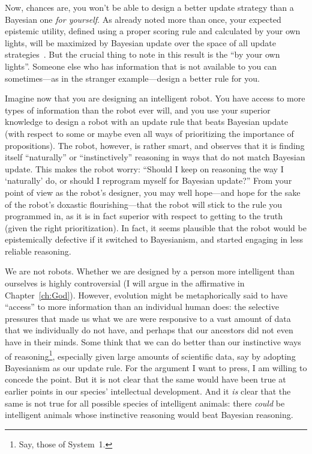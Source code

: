Now, chances are, you won't be able to design a better update strategy than a Bayesian one \textit{for yourself}.
As already noted more than once, your expected epistemic utility, defined using a proper scoring rule and calculated by your 
own lights, will be maximized by Bayesian update over the space of all update strategies~\parencite{GreavesWallace}. But the crucial thing to 
note in this result is the ``by your own lights''. Someone else who has information that is not available to you can 
sometimes---as in the stranger example---design a better rule for you. 

Imagine now that you are designing an intelligent robot. You have access to more types of information than the robot ever 
will, and you use your superior knowledge to design a robot with an update rule that beats Bayesian update (with respect to 
some or maybe even all ways of prioritizing the importance of propositions). The robot, however, is rather smart, 
and observes that it is finding itself ``naturally'' or ``instinctively'' reasoning in ways that do not match Bayesian update. This makes the 
robot worry: ``Should I keep on reasoning the way I `naturally' do, or should I reprogram myself for Bayesian update?''
From your point of view as the robot's designer, you may well hope---and hope for the sake of the robot's doxastic
flourishing---that the robot will stick to the rule you programmed in, as it is in fact superior with respect to getting
to the truth (given the right prioritization). In fact, it seems plausible that the robot would be epistemically defective 
if it switched to Bayesianism, and started engaging in less reliable reasoning.

We are not robots. Whether we are designed by a person more intelligent than ourselves is highly controversial (I will 
argue in the affirmative in Chapter~\ref{ch:God}). However, evolution might be metaphorically said to have ``access'' to more 
information than an individual human does: the selective pressures that made us what we are were responsive to a vast amount
of data that we individually do not have, and perhaps that our ancestors did not even have in their minds. Some think 
that we can do better than our instinctive ways of reasoning\footnote{Say, those of  System~1.}, 
especially given large amounts of scientific data,
say by adopting Bayesianism as our update rule. For the argument I want 
to press, I am willing to concede the point. But it is not clear that the same would have been true at earlier points in our species' intellectual development. And it \textit{is} clear that the same is not true for all possible species 
of intelligent animals: there \textit{could} be intelligent animals whose instinctive reasoning would beat Bayesian
reasoning. 

